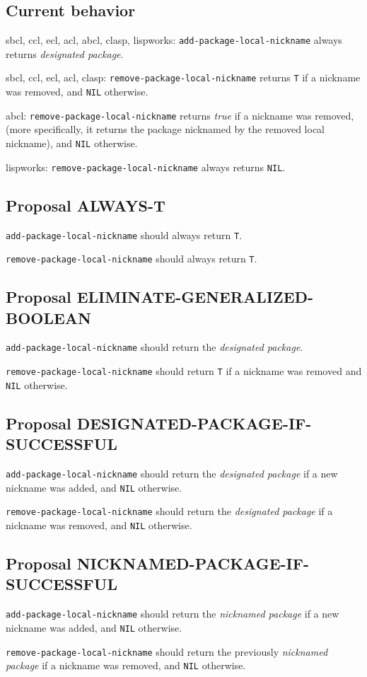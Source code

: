 \documentclass[11pt]{article}
\begin{document}
\subsection{Current behavior}
\label{sec:org23ae73d}
sbcl, ccl, ecl, acl, abcl, clasp, lispworks:
  \texttt{add-package-local-nickname} always returns \emph{designated package}.

sbcl, ccl, ecl, acl, clasp:
  \texttt{remove-package-local-nickname} returns \texttt{T} if a nickname was removed,
  and \texttt{NIL} otherwise.

abcl:
  \texttt{remove-package-local-nickname} returns \emph{true} if a nickname was removed, (more
  specifically, it returns the package nicknamed by the removed local nickname),
  and \texttt{NIL} otherwise.

lispworks:
  \texttt{remove-package-local-nickname} always returns \texttt{NIL}.
\subsection{Proposal ALWAYS-T}
\label{sec:org34cbb92}
\texttt{add-package-local-nickname} should always return \texttt{T}.

\texttt{remove-package-local-nickname} should always return \texttt{T}.
\subsection{Proposal ELIMINATE-GENERALIZED-BOOLEAN}
\label{sec:orgd5a5c1f}
\texttt{add-package-local-nickname} should return the \emph{designated package}.

\texttt{remove-package-local-nickname} should return \texttt{T} if a nickname was removed and
\texttt{NIL} otherwise.
\subsection{Proposal DESIGNATED-PACKAGE-IF-SUCCESSFUL}
\label{sec:org6f252c4}
\texttt{add-package-local-nickname} should return the \emph{designated package} if a new
nickname was added, and \texttt{NIL} otherwise.

\texttt{remove-package-local-nickname} should return the \emph{designated package} if a
nickname was removed, and \texttt{NIL} otherwise.
\subsection{Proposal NICKNAMED-PACKAGE-IF-SUCCESSFUL}
\label{sec:org979c9c1}
\texttt{add-package-local-nickname} should return the \emph{nicknamed package} if a new
nickname was added, and \texttt{NIL} otherwise.

\texttt{remove-package-local-nickname} should return the previously \emph{nicknamed package}
if a nickname was removed, and \texttt{NIL} otherwise.
\end{document}
